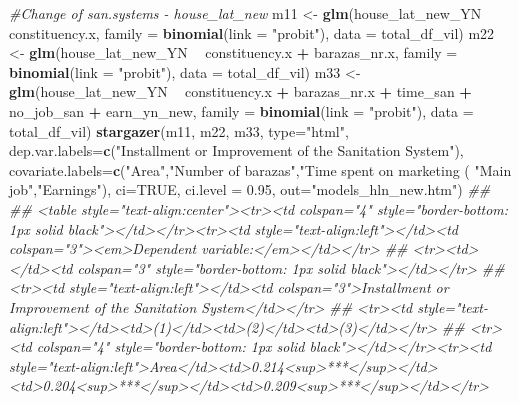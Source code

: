 \documentclass[
]{article}
\newenvironment{Shaded}{\begin{snugshade}}{\end{snugshade}}
\newcommand{\CommentTok}[1]{\textcolor[rgb]{0.56,0.35,0.01}{\textit{#1}}}
\newcommand{\DataTypeTok}[1]{\textcolor[rgb]{0.13,0.29,0.53}{#1}}
\newcommand{\FloatTok}[1]{\textcolor[rgb]{0.00,0.00,0.81}{#1}}
\newcommand{\KeywordTok}[1]{\textcolor[rgb]{0.13,0.29,0.53}{\textbf{#1}}}
\newcommand{\NormalTok}[1]{#1}
\newcommand{\OperatorTok}[1]{\textcolor[rgb]{0.81,0.36,0.00}{\textbf{#1}}}
\newcommand{\OtherTok}[1]{\textcolor[rgb]{0.56,0.35,0.01}{#1}}
\newcommand{\StringTok}[1]{\textcolor[rgb]{0.31,0.60,0.02}{#1}}
\begin{document}
\begin{Shaded}
\begin{Highlighting}[]
{{\CommentTok{#Change of san.systems - house_lat_new}
\NormalTok{m11 <-}\StringTok{ }\KeywordTok{glm}\NormalTok{(house_lat_new_YN }\OperatorTok{~}\StringTok{ }\NormalTok{constituency.x, }\DataTypeTok{family =} \KeywordTok{binomial}\NormalTok{(}\DataTypeTok{link =} \StringTok{"probit"}\NormalTok{), }
           \DataTypeTok{data =}\NormalTok{ total_df_vil)}
\NormalTok{m22 <-}\StringTok{ }\KeywordTok{glm}\NormalTok{(house_lat_new_YN }\OperatorTok{~}\StringTok{ }\NormalTok{constituency.x }\OperatorTok{+}\StringTok{ }\NormalTok{barazas_nr.x, }\DataTypeTok{family =} \KeywordTok{binomial}\NormalTok{(}\DataTypeTok{link =} \StringTok{"probit"}\NormalTok{), }
           \DataTypeTok{data =}\NormalTok{ total_df_vil)}
\NormalTok{m33 <-}\StringTok{ }\KeywordTok{glm}\NormalTok{(house_lat_new_YN }\OperatorTok{~}\StringTok{ }\NormalTok{constituency.x }\OperatorTok{+}\StringTok{ }\NormalTok{barazas_nr.x }\OperatorTok{+}\StringTok{ }\NormalTok{time_san }\OperatorTok{+}\StringTok{ }\NormalTok{no_job_san }\OperatorTok{+}\StringTok{ }\NormalTok{earn_yn_new, }\DataTypeTok{family =} \KeywordTok{binomial}\NormalTok{(}\DataTypeTok{link =} \StringTok{"probit"}\NormalTok{), }
           \DataTypeTok{data =}\NormalTok{ total_df_vil)}
\KeywordTok{stargazer}\NormalTok{(m11, m22, m33, }\DataTypeTok{type=}\StringTok{"html"}\NormalTok{,}
          \DataTypeTok{dep.var.labels=}\KeywordTok{c}\NormalTok{(}\StringTok{"Installment or Improvement of the Sanitation System"}\NormalTok{),}
          \DataTypeTok{covariate.labels=}\KeywordTok{c}\NormalTok{(}\StringTok{"Area"}\NormalTok{,}\StringTok{"Number of barazas"}\NormalTok{,}\StringTok{"Time spent on marketing (%) "}\NormalTok{,}
                             \StringTok{"Main job"}\NormalTok{,}\StringTok{"Earnings"}\NormalTok{), }\DataTypeTok{ci=}\OtherTok{TRUE}\NormalTok{, }\DataTypeTok{ci.level =} \FloatTok{0.95}\NormalTok{, }\DataTypeTok{out=}\StringTok{"models_hln_new.htm"}\NormalTok{)}
\CommentTok{## }
\CommentTok{## <table style="text-align:center"><tr><td colspan="4" style="border-bottom: 1px solid black"></td></tr><tr><td style="text-align:left"></td><td colspan="3"><em>Dependent variable:</em></td></tr>}
\CommentTok{## <tr><td></td><td colspan="3" style="border-bottom: 1px solid black"></td></tr>}
\CommentTok{## <tr><td style="text-align:left"></td><td colspan="3">Installment or Improvement of the Sanitation System</td></tr>}
\CommentTok{## <tr><td style="text-align:left"></td><td>(1)</td><td>(2)</td><td>(3)</td></tr>}
\CommentTok{## <tr><td colspan="4" style="border-bottom: 1px solid black"></td></tr><tr><td style="text-align:left">Area</td><td>0.214<sup>***</sup></td><td>0.204<sup>***</sup></td><td>0.209<sup>***</sup></td></tr>}
}}}
\end{Highlighting}
\end{Shaded}
\end{document}
